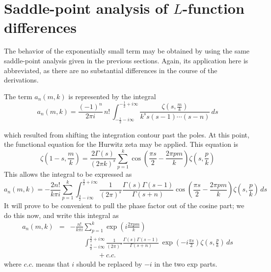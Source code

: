 \documentclass{amsart}
\begin{document}
\section{Saddle-point analysis of $L$-function differences}
The behavior of the exponentially small term may be obtained 
by using the same saddle-point analysis given in the previous
sections. Again, its application here is abbreviated, as there
are no substantial differences in the course of the derivations.

The term $a_{n}(m,k)$ is represented by the integral
\begin{equation}
a_{n}(m,k)=\frac{(-1)^{n}}{2\pi i}\, n!\,
\int_{-\frac{1}{2}-i\infty}^{-\frac{1}{2}+i\infty}
\frac{\zeta\left(s,\frac{m}{k}\right)}{k^{s}s(s-1)\cdots(s-n)}\, ds
\label{eq:little-a-integral}\end{equation}

 which resulted from shifting the integration contour past the poles.
At this point, the functional equation for the Hurwitz zeta may be
applied. This equation is 
\begin{equation}
\zeta\left(1-s,\frac{m}{k}\right)
=\frac{2\Gamma(s)}{(2\pi k)^{s}}
\sum_{p=1}^{k}\cos\left(\frac{\pi s}{2}-\frac{2\pi pm}{k}\right)
\zeta\left(s,\frac{p}{k}\right)
\end{equation}
 This allows the integral to be expressed as
\begin{equation}
a_{n}(m,k)=-\frac{2n!}{k\pi i}\sum_{p=1}^{k}
\int_{\frac{3}{2}-i\infty}^{\frac{3}{2}+i\infty}
\frac{1}{(2\pi)^{s}}\frac{\Gamma(s)\Gamma(s-1)}{\Gamma(s+n)}
\cos\left(\frac{\pi s}{2}-\frac{2\pi pm}{k}\right)
\zeta\left(s,\frac{p}{k}\right)\, ds
\end{equation}
 It will prove to be convenient to pull the phase factor out of the
cosine part; we do this now, and write this integral as 
\begin{eqnarray}
a_{n}(m,k) & = & -\frac{n!}{k\pi i}
\sum_{p=1}^{k}\exp\left(i\frac{2\pi pm}{k}\right) \\
 & & \qquad 
\int_{\frac{3}{2}-i\infty}^{\frac{3}{2}+i\infty}
\frac{1}{(2\pi)^{s}}\frac{\Gamma(s)\Gamma(s-1)}{\Gamma(s+n)}\,
\exp\left(-i\frac{\pi s}{2}\right)
\zeta\left(s,\frac{p}{k}\right)\, ds
\label{eq:two-integrals}\\
 &  & \qquad \qquad +c.c.\nonumber 
\end{eqnarray}
 where $c.c.$ means that $i$ should be replaced by $-i$ in the
two exp parts.
\end{document}
